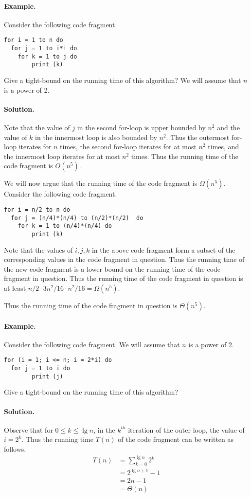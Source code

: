 \documentclass[11pt,twoside]{article}
\begin{document}
\paragraph{Example.}
Consider the following code fragment.
\begin{verbatim}
for i = 1 to n do
  for j = 1 to i*i do
    for k = 1 to j do
        print (k)
\end{verbatim}
Give a tight-bound on the running time of this algorithm? We will
assume that $n$ is a power of 2.

\paragraph{Solution.} Note that the value of $j$ in the second
for-loop is upper bounded by $n^2$ and the value of $k$ in the
innermost loop is also bounded by $n^2$. Thus the outermost for-loop
iterates for $n$ times, the second for-loop iterates for at most $n^2$
times, and the innermost loop iterates for at most $n^2$ times. Thus
the running time of the code fragment is $O(n^5)$. 

We will now argue that the running time of the code fragment is
$\Omega(n^5)$. Consider the following code fragment.
\begin{verbatim}
for i = n/2 to n do
  for j = (n/4)*(n/4) to (n/2)*(n/2)  do
    for k = 1 to (n/4)*(n/4) do
        print (k)
\end{verbatim}
Note that the values of $i,j,k$ in the above code fragment form a
subset of the corresponding values in the code fragment in
question. Thus the running time of the new code fragment is a lower bound
on the running time of the code fragment in question. Thus the running
time of the code fragment in question is at least $n/2\cdot 3n^2/16 \cdot
n^2/16=\Omega(n^5)$.

Thus the running time of the code fragment in question is $\Theta(n^5)$. 

\paragraph{Example.}
Consider the following code fragment. We will assume that $n$ is a
power of 2.
\begin{verbatim}
for (i = 1; i <= n; i = 2*i) do
  for j = 1 to i do
        print (j)
\end{verbatim}
Give a tight-bound on the running time of this algorithm? 

\paragraph{Solution.} Observe that for $0\leq k\leq \lg n$, in the $k^{th}$ iteration of the
outer loop, the value of $i=2^{k}$. Thus the running time $T(n)$ of
the code fragment can be written as follows.
\begin{align*}
T(n) &= \sum_{k=0}^{\lg n}2^{k} \\
&= 2^{\lg n+1} -1 \\
&= 2n-1\\
&=\Theta(n)
\end{align*}
 
\end{document}
